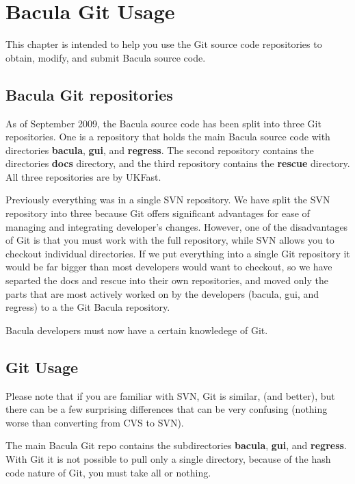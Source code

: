 \chapter{Bacula Git Usage}
\label{_GitChapterStart}

This chapter is intended to help you use the Git source code
repositories to obtain, modify, and submit Bacula source code.


\section{Bacula Git repositories}
As of September 2009, the Bacula source code has been split into
three Git repositories.  One is a repository that holds the
main Bacula source code with directories {\bf bacula}, {\bf gui},
and {\bf regress}.  The second repository contains
the directories {\bf docs} directory, and the third repository
contains the {\bf rescue} directory. All three repositories are 
by UKFast.

Previously everything was in a single SVN repository.
We have split the SVN repository into three because Git
offers significant advantages for ease of managing and integrating
developer's changes.  However, one of the disadvantages of Git is that you
must work with the full repository, while SVN allows you to checkout
individual directories.  If we put everything into a single Git
repository it would be far bigger than most developers would want
to checkout, so we have separted the docs and rescue into their own
repositories, and moved only the parts that are most actively 
worked on by the developers (bacula, gui, and regress) to a the
Git Bacula repository.  

Bacula developers must now have a certain knowledege of Git.

\section{Git Usage}

Please note that if you are familiar with SVN, Git is similar,
(and better), but there can be a few surprising differences that
can be very confusing (nothing worse than converting from CVS to SVN).

The main Bacula Git repo contains the subdirectories {\bf bacula}, {\bf gui},
and {\bf regress}. With Git it is not possible to pull only a
single directory, because of the hash code nature of Git, you
must take all or nothing.

